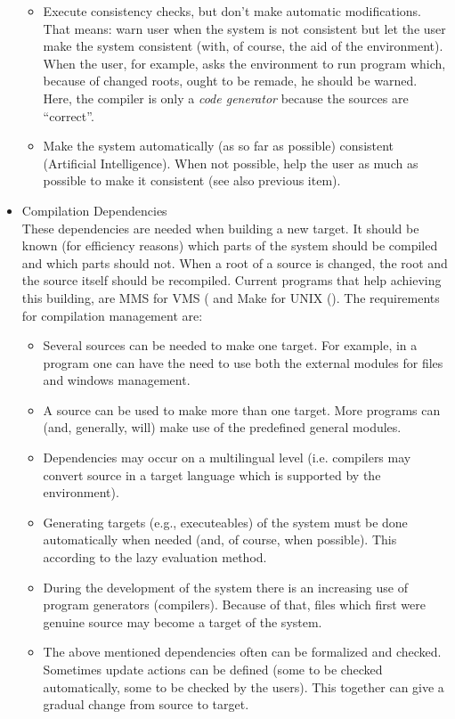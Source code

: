 \begin{itemize}
\begin{itemize}
      \item Execute consistency checks, but don't make automatic 
            modifications. That means: warn user when the system is not 
            consistent but let the user make the system consistent (with, of 
            course, the aid of the environment). When the user, for example, 
            asks the environment to run program which, because of changed 
            roots, ought to be remade, he should be warned. Here, the compiler 
            is only a {\em code generator}\/ because the sources are 
            ``correct''.
      \item Make the system automatically (as so far as possible) consistent 
            (Artificial Intelligence). When not possible, help the user as 
            much as possible to make it consistent (see also previous item). 
    \end{itemize}
   \item Compilation Dependencies\\
    These dependencies are needed when building a new target. It should be 
    known (for efficiency reasons) which parts of the system should be compiled 
    and which parts should not. When a root of a source is changed, the root 
    and the source itself should be recompiled. Current programs that help 
    achieving this building, are MMS for VMS (\cite{dec:mms} and Make for UNIX
    (\cite{fel:make}). The requirements for compilation management are:
    \begin{itemize} 
      \item Several sources can be needed to make one target. For example, in a 
            program one can have the need to use both the external modules for
            files and windows management.
      \item A source can be used to make more than one target. More programs 
            can (and, generally, will) make use of the predefined general 
            modules.
      \item Dependencies may occur on a multilingual level (i.e. compilers may 
            convert source in a target language which is supported by the 
            environment).
      \item Generating targets (e.g., executeables) of the system must be 
            done automatically when needed (and, of course, when possible).
            This according to the lazy evaluation method.
      \item During the development of the system there is an increasing use of 
            program generators (compilers). Because of that, files which first 
            were genuine source may become a target of the system.
      \item The above mentioned dependencies often can be formalized and 
            checked. Sometimes update actions can be defined (some to be 
            checked automatically, some to be checked by the users). This 
            together can give a gradual change from source to target.
    \end{itemize}
 \end{itemize}
